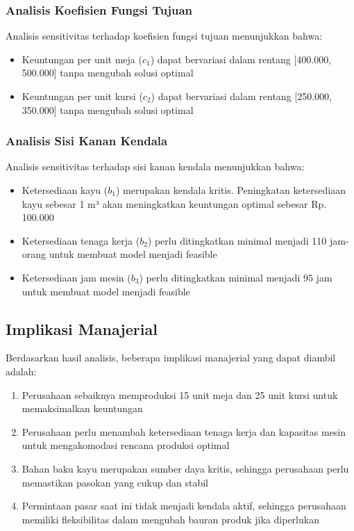 \documentclass[twocolumn]{article}
\begin{document}
\subsubsection{Analisis Koefisien Fungsi Tujuan}
Analisis sensitivitas terhadap koefisien fungsi tujuan menunjukkan bahwa:
\begin{itemize}
    \item Keuntungan per unit meja ($c_1$) dapat bervariasi dalam rentang [400.000, 500.000] tanpa mengubah solusi optimal
    \item Keuntungan per unit kursi ($c_2$) dapat bervariasi dalam rentang [250.000, 350.000] tanpa mengubah solusi optimal
\end{itemize}

\subsubsection{Analisis Sisi Kanan Kendala}
Analisis sensitivitas terhadap sisi kanan kendala menunjukkan bahwa:
\begin{itemize}
    \item Ketersediaan kayu ($b_1$) merupakan kendala kritis. Peningkatan ketersediaan kayu sebesar 1 m³ akan meningkatkan keuntungan optimal sebesar Rp. 100.000
    \item Ketersediaan tenaga kerja ($b_2$) perlu ditingkatkan minimal menjadi 110 jam-orang untuk membuat model menjadi feasible
    \item Ketersediaan jam mesin ($b_3$) perlu ditingkatkan minimal menjadi 95 jam untuk membuat model menjadi feasible
\end{itemize}

\subsection{Implikasi Manajerial}
Berdasarkan hasil analisis, beberapa implikasi manajerial yang dapat diambil adalah:
\begin{enumerate}
    \item Perusahaan sebaiknya memproduksi 15 unit meja dan 25 unit kursi untuk memaksimalkan keuntungan
    \item Perusahaan perlu menambah ketersediaan tenaga kerja dan kapasitas mesin untuk mengakomodasi rencana produksi optimal
    \item Bahan baku kayu merupakan sumber daya kritis, sehingga perusahaan perlu memastikan pasokan yang cukup dan stabil
    \item Permintaan pasar saat ini tidak menjadi kendala aktif, sehingga perusahaan memiliki fleksibilitas dalam mengubah bauran produk jika diperlukan
\end{enumerate}
\end{document}
